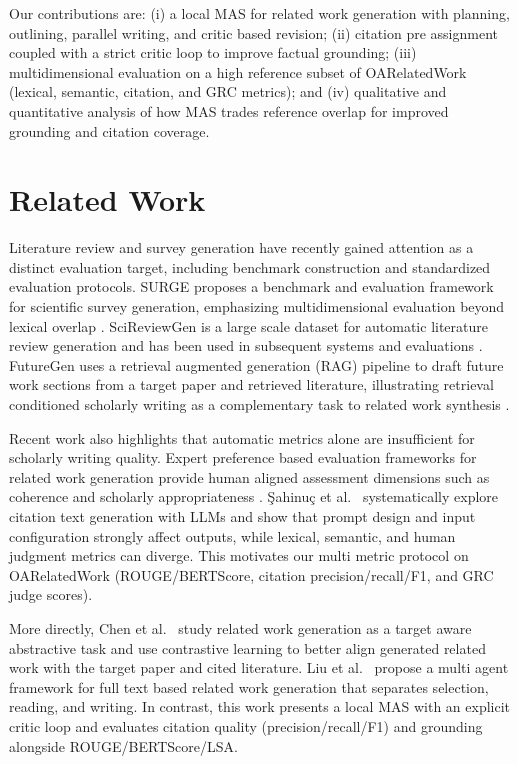 \documentclass[conference]{IEEEtran}
\begin{document}
Our contributions are: (i) a local MAS for related work generation with planning, outlining, parallel writing, and critic based revision; (ii) citation pre assignment coupled with a strict critic loop to improve factual grounding; (iii) multidimensional evaluation on a high reference subset of OARelatedWork (lexical, semantic, citation, and GRC metrics); and (iv) qualitative and quantitative analysis of how MAS trades reference overlap for improved grounding and citation coverage.

\section{Related Work}
\label{sec:related_work}
Literature review and survey generation have recently gained attention as a distinct evaluation target, including benchmark construction and standardized evaluation protocols.
SURGE proposes a benchmark and evaluation framework for scientific survey generation, emphasizing multidimensional evaluation beyond lexical overlap \cite{surge2025}.
SciReviewGen is a large scale dataset for automatic literature review generation and has been used in subsequent systems and evaluations \cite{scireviewgen2023}.
FutureGen uses a retrieval augmented generation (RAG) pipeline to draft future work sections from a target paper and retrieved literature, illustrating retrieval conditioned scholarly writing as a complementary task to related work synthesis \cite{azher2025futuregen}.

Recent work also highlights that automatic metrics alone are insufficient for scholarly writing quality.
Expert preference based evaluation frameworks for related work generation provide human aligned assessment dimensions such as coherence and scholarly appropriateness \cite{expertEvalRW2025}.
\c{S}ahinu\c{c} et al.~\cite{sahinuc2024citationtext} systematically explore citation text generation with LLMs and show that prompt design and input configuration strongly affect outputs, while lexical, semantic, and human judgment metrics can diverge. This motivates our multi metric protocol on OARelatedWork (ROUGE/BERTScore, citation precision/recall/F1, and GRC judge scores).

More directly, Chen et al.~\cite{chen2022tag} study related work generation as a target aware abstractive task and use contrastive learning to better align generated related work with the target paper and cited literature.
Liu et al.~\cite{liu2025selectreadwrite} propose a multi agent framework for full text based related work generation that separates selection, reading, and writing.
In contrast, this work presents a local MAS with an explicit critic loop and evaluates citation quality (precision/recall/F1) and grounding alongside ROUGE/BERTScore/LSA.
\end{document}
